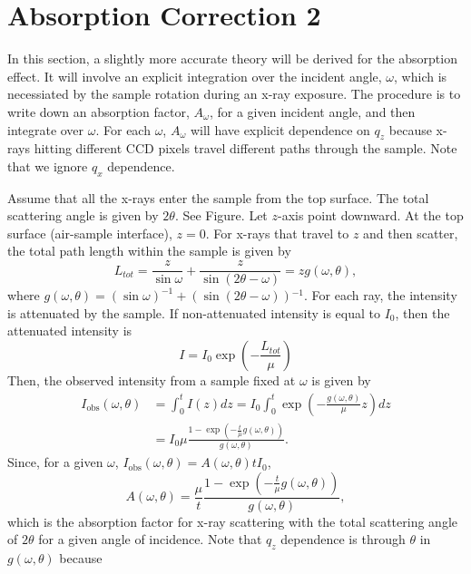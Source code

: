 \documentclass[letterpaper,12pt]{article}
\newcommand{\pars}[1]{\mathopen{}\left( #1 \right)\mathclose{}} %
\newcommand{\+}{^{\dagger}}%
\begin{document}
\section{Absorption Correction 2}
In this section, a slightly more accurate theory will be derived for the absorption
effect. It will involve an explicit integration over the incident angle, $\omega$,
which is necessiated by the sample rotation during an x-ray exposure. The procedure
is to write down an absorption factor, $A_{\omega}$, for a given incident angle, and
then integrate over $\omega$. For each $\omega$, $A_{\omega}$ will have explicit
dependence on $q_z$ because x-rays hitting different CCD pixels travel different 
paths through the sample. Note that we ignore $q_x$ dependence.

Assume that all the x-rays enter the sample from the top surface. The total scattering
angle is given by $2\theta$. See Figure. Let $z$-axis point downward. At the top surface
(air-sample interface), $z=0$. For x-rays that travel to $z$ and then scatter, the
total path length within the sample is given by
\begin{equation}
  L_{tot} = \frac{z}{\sin\omega}+\frac{z}{\sin(2\theta-\omega)} = zg(\omega,\theta),
\end{equation}
where $g(\omega,\theta)=(\sin\omega)^{-1}+\pars{\sin\pars{2\theta-\omega}}^{-1}$.
For each ray, the intensity is attenuated by the sample. If non-attenuated 
intensity is equal to $I_0$, then the attenuated intensity is
\begin{equation}
  I = I_0\exp\left(-\frac{L_{tot}}{\mu}\right)
\end{equation}
Then, the observed intensity from a sample fixed at $\omega$ is given by
\begin{align}
  I_{\textrm{obs}}(\omega,\theta) 
    &= \int_0^t I(z) dz
     = I_0\int_0^t \exp\left(-\frac{g(\omega,\theta)}{\mu}z\right)dz \nonumber \\
    &= I_0\mu \frac{1-\exp\left(-\frac{t}{\mu}g(\omega,\theta)\right)}{g(\omega,\theta)}.
\end{align}
Since, for a given $\omega$, $I_{\textrm{obs}}(\omega,\theta)=A(\omega,\theta)tI_0$, 
\begin{equation}
  A(\omega,\theta) = \frac{\mu}{t} 
                     \frac{1-\exp\left(-\frac{t}{\mu}g(\omega,\theta)\right)}{g(\omega,\theta)},
\end{equation}
which is the absorption factor for x-ray scattering with the total 
scattering angle of $2\theta$ for a  given angle of incidence.
Note that $q_z$ dependence is through $\theta$ in $g(\omega,\theta)$ because
\end{document}

